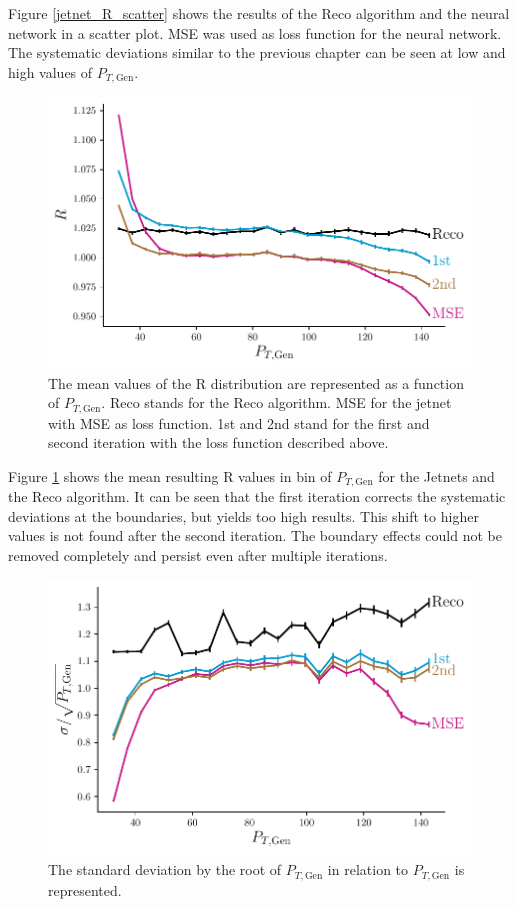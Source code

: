 \documentclass[12pt, a4paper]{thesis}
\begin{document}
Figure \ref{jetnet_R_scatter} shows the results of the Reco algorithm
and the neural network in a scatter plot. MSE was used as loss
function for the neural network. The systematic deviations similar to
the previous chapter can be seen at low and high values of \(P_{T,
  \text{Gen}}\).

 
\begin{figure}[H]
  \includegraphics[width=.9\linewidth]{../images/jetnet_R.pdf}
  \caption{The mean values of the R distribution are represented as a
    function of \(P_{T, \text{Gen}}\). Reco stands for the Reco
    algorithm. MSE for the jetnet with MSE as loss function. 1st and
    2nd stand for the first and second iteration with the loss
    function described above. }
  \label{jetnet_R}
\end{figure}

Figure \ref{jetnet_R} shows the mean resulting R values in bin of
\(P_{T, \text{Gen}}\) for the Jetnets and the Reco algorithm. It can
be seen that the first iteration corrects the systematic deviations at
the boundaries, but yields too high results. This shift to higher
values is not found after the second iteration. The boundary effects
could not be removed completely and persist even after multiple
iterations.

\begin{figure}[H]
  \centering
  \includegraphics[width=.9\linewidth]{../images/jetnet_res.pdf}
  \caption{ The standard deviation by the root of \(P_{T, \text{Gen}}\)
    in relation to \(P_{T, \text{Gen}}\) is represented.}
  \label{jetnet_res}
\end{figure}
\end{document}

